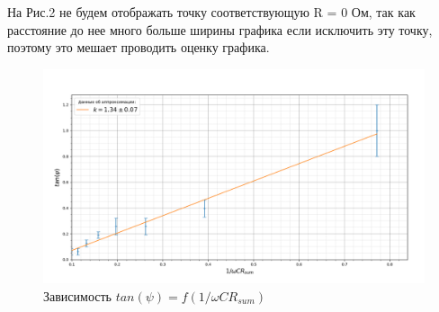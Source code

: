 \documentclass[a4paper, 12pt]{article}%
\begin{document}
	На Рис.2 не будем отображать точку соответствующую R = 0 Ом, так как расстояние до нее много больше ширины графика если исключить эту точку, поэтому это мешает проводить оценку графика.
	\begin{figure}[H]
		\centering
		\includegraphics[width=0.9\linewidth]{RC}
		\caption{Зависимость $tan(\psi) = f(1/\omega C R_{sum})$}
		\label{fig:rc}
	\end{figure}
\end{document}

